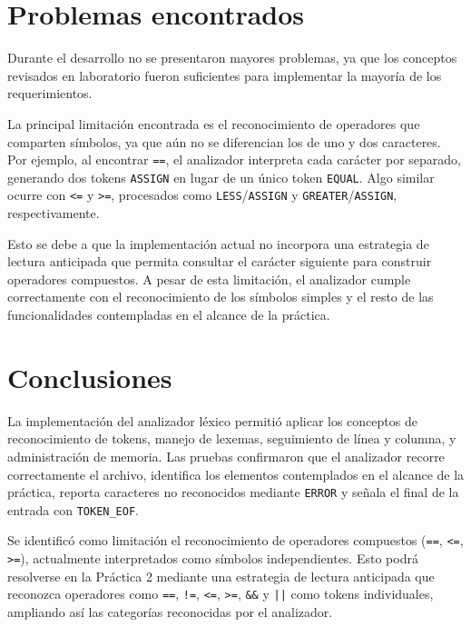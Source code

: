 \documentclass[12pt,letterpaper]{article}
\begin{document}
\section*{Problemas encontrados}
Durante el desarrollo no se presentaron mayores problemas, ya que los conceptos revisados en laboratorio fueron suficientes para implementar la mayoría de los requerimientos.

La principal limitación encontrada es el reconocimiento de operadores que comparten símbolos, ya que aún no se diferencian los de uno y dos caracteres. Por ejemplo, al encontrar \texttt{==}, el analizador interpreta cada carácter por separado, generando dos tokens \texttt{ASSIGN} en lugar de un único token \texttt{EQUAL}. Algo similar ocurre con \texttt{<=} y \texttt{>=}, procesados como \texttt{LESS}/\texttt{ASSIGN} y \texttt{GREATER}/\texttt{ASSIGN}, respectivamente.

Esto se debe a que la implementación actual no incorpora una estrategia de lectura anticipada que permita consultar el carácter siguiente para construir operadores compuestos. A pesar de esta limitación, el analizador cumple correctamente con el reconocimiento de los símbolos simples y el resto de las funcionalidades contempladas en el alcance de la práctica.

\section*{Conclusiones}
La implementación del analizador léxico permitió aplicar los conceptos de reconocimiento de tokens, manejo de lexemas, seguimiento de línea y columna, y administración de memoria. Las pruebas confirmaron que el analizador recorre correctamente el archivo, identifica los elementos contemplados en el alcance de la práctica, reporta caracteres no reconocidos mediante \texttt{ERROR} y señala el final de la entrada con \texttt{TOKEN\_EOF}.

Se identificó como limitación el reconocimiento de operadores compuestos (\texttt{==}, \texttt{<=}, \texttt{>=}), actualmente interpretados como símbolos independientes. Esto podrá resolverse en la Práctica 2 mediante una estrategia de lectura anticipada que reconozca operadores como \texttt{==}, \texttt{!=}, \texttt{<=}, \texttt{>=}, \texttt{\&\&} y \texttt{||} como tokens individuales, ampliando así las categorías reconocidas por el analizador.
\end{document}

